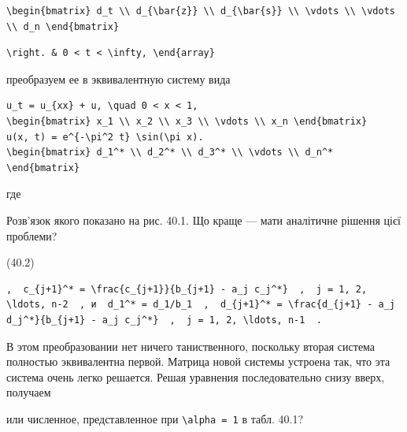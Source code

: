 \documentclass[
  ukrainian,
]{article}
\begin{document}
\begin{verbatim}
\begin{bmatrix} d_t \\ d_{\bar{z}} \\ d_{\bar{s}} \\ \vdots \\ \vdots \\ d_n \end{bmatrix}
\end{verbatim}

\begin{verbatim}
\right. & 0 < t < \infty, \end{array}
\end{verbatim}

преобразуем ее в эквивалентную систему вида

\begin{verbatim}
u_t = u_{xx} + u, \quad 0 < x < 1,
\begin{bmatrix} x_1 \\ x_2 \\ x_3 \\ \vdots \\ x_n \end{bmatrix}
u(x, t) = e^{-\pi^2 t} \sin(\pi x).
\begin{bmatrix} d_1^* \\ d_2^* \\ d_3^* \\ \vdots \\ d_n^* \end{bmatrix}
\end{verbatim}

где

Розв'язок якого показано на рис. 40.1. Що краще --- мати аналітичне
рішення цієї проблеми?

(40.2)

\begin{verbatim}
,  c_{j+1}^* = \frac{c_{j+1}}{b_{j+1} - a_j c_j^*}  ,  j = 1, 2, \ldots, n-2  , и  d_1^* = d_1/b_1  ,  d_{j+1}^* = \frac{d_{j+1} - a_j d_j^*}{b_{j+1} - a_j c_j^*}  ,  j = 1, 2, \ldots, n-1  .
\end{verbatim}

В этом преобразовании нет ничего таниственного, поскольку вторая система
полностью эквивалентна первой. Матрица новой системы устроена так, что
эта система очень легко решается. Решая уравнения последовательно снизу
вверх, получаем

или численное, представленное при \texttt{\textbackslash{}alpha\ =\ 1} в
табл. 40.1?
\end{document}
